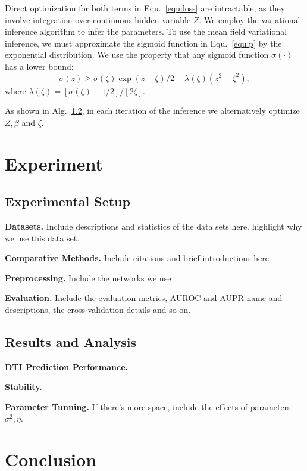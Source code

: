 \documentclass[sigconf,anonymous]{acmart}
\begin{document}
Direct optimization for both terms in Equ.~\ref{equ:loss} are intractable, as they involve integration over continuous hidden variable $Z$. We employ the variational inference algorithm to infer the parameters. To use the mean field variational inference, we must approximate the sigmoid function in Equ.~\ref{equ:p} by the exponential distribution. We use the property that any sigmoid function $\sigma(\cdot)$ has a lower bound: 
\begin{equation}
\sigma(z)\geq \sigma(\zeta)\exp{(z-\zeta)/2-\lambda(\zeta)(z^2-\zeta^2)},
\end{equation}  
where $\lambda(\zeta)=[\sigma(\zeta)-1/2]/[2\zeta]$. 

As shown in Alg.~\ref{}, in each iteration of the inference we alternatively optimize $Z,\beta$ and $\zeta$. 
\section{Experiment}\label{sec:experiment}
\subsection{Experimental Setup}

\textbf{Datasets.} Include descriptions and statistics of the data sets here. highlight why we use this data set.

\textbf{Comparative Methods.} Include citations and brief introductions here.

\textbf{Preprocessing.} Include the networks we use

\textbf{Evaluation.} Include the evaluation metrics, AUROC and AUPR name and descriptions, the cross validation details and so on.

\subsection{Results and Analysis}
\textbf{DTI Prediction Performance.}

\textbf{Stability.}

\textbf{Parameter Tunning.} If there's more space, include the effects of parameters $\sigma^2,\eta$. 

\section{Conclusion}\label{sec:conclusion}
\end{document}
